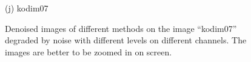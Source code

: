 \documentclass[10pt,twocolumn,letterpaper,sort&compress]{article}
\begin{document}
\begin{figure}
{\begin{minipage}[t]{0.195\textwidth}
{\footnotesize (j) kodim07}
\end{minipage}
}\vspace{-0.5mm}
\caption{Denoised images of different methods on the image ``kodim07'' degraded by noise with different levels on different channels. The images are better to be zoomed in on screen.}
\label{f3}
\vspace{-3mm}
\end{figure}

\begin{figure}
\centering
{}
\end{figure}
\end{document}
